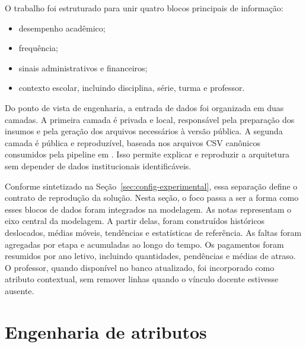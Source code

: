 O trabalho foi estruturado para unir quatro blocos principais de informa\c{c}\~ao:
\begin{itemize}
    \item desempenho acad\^emico;
    \item frequ\^encia;
    \item sinais administrativos e financeiros;
    \item contexto escolar, incluindo disciplina, s\'erie, turma e professor.
\end{itemize}

Do ponto de vista de engenharia, a entrada de dados foi organizada em duas camadas. A primeira camada \'e privada e local, respons\'avel pela prepara\c{c}\~ao dos insumos e pela gera\c{c}\~ao dos arquivos necess\'arios \`a vers\~ao p\'ublica. A segunda camada \'e p\'ublica e reproduz\'ivel, baseada nos arquivos CSV can\^onicos consumidos pela pipeline em . Isso permite explicar e reproduzir a arquitetura sem depender de dados institucionais identific\'aveis.

Conforme sintetizado na Se\c{c}\~ao~\ref{sec:config-experimental}, essa separa\c{c}\~ao define o contrato de reprodu\c{c}\~ao da solu\c{c}\~ao. Nesta se\c{c}\~ao, o foco passa a ser a forma como esses blocos de dados foram integrados na modelagem. As notas representam o eixo central da modelagem. A partir delas, foram constru\'idos hist\'oricos deslocados, m\'edias m\'oveis, tend\^encias e estat\'isticas de refer\^encia. As faltas foram agregadas por etapa e acumuladas ao longo do tempo. Os pagamentos foram resumidos por ano letivo, incluindo quantidades, pend\^encias e m\'edias de atraso. O professor, quando dispon\'ivel no banco atualizado, foi incorporado como atributo contextual, sem remover linhas quando o v\'inculo docente estivesse ausente.

\section{Engenharia de atributos}
\label{sec:atributos-temporais-construidos}
\label{sec:engenharia}


